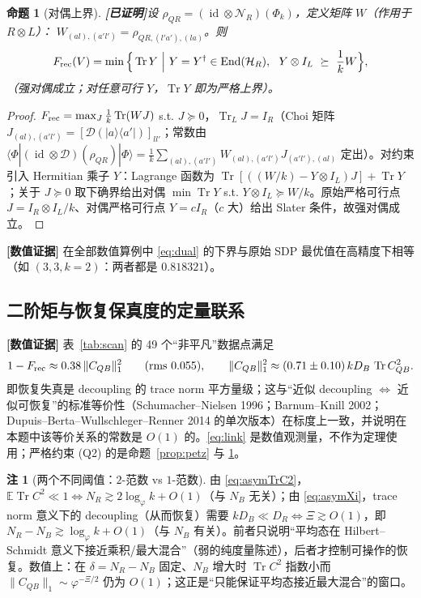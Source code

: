 \documentclass[11pt,a4paper]{ctexart}
\newtheorem{proposition}{命题}
\theoremstyle{definition}
\newtheorem{remark}{注}
\newcommand{\proved}{\textcolor{green!45!black}{\textbf{[已证明]}}}
\newcommand{\numeric}{\textcolor{blue!70!black}{\textbf{[数值证据]}}}
\newcommand{\Tr}{\operatorname{Tr}}
\newcommand{\End}{\operatorname{End}}
\newcommand{\id}{\operatorname{id}}
\newcommand{\E}{\mathbb{E}}
\newcommand{\ph}{\varphi}
\newcommand{\Frec}{F_{\rm rec}}
\begin{document}
\begin{proposition}[对偶上界]\proved{}\label{prop:dual}
设 $\rho_{QR}=(\id\otimes\mathcal N_R)(\Phi_k)$，定义矩阵 $W$（作用于 $R\otimes L$）：
$W_{(al),(a'l')}=\rho_{QR,(l'a'),(la)}$。则
\begin{equation}\label{eq:dual}
\Frec(V)=\min\Big\{\Tr Y\ \Big|\ Y=Y^\dagger\in\End(\mathcal H_R),\ \ Y\otimes I_L\ \succeq\ \frac{1}{k}W\Big\},
\end{equation}
（强对偶成立；对任意可行 $Y$，$\Tr Y$ 即为严格上界）。
\end{proposition}
\begin{proof}
$\Frec=\max_J\frac1k\Tr(WJ)$ s.t. $J\succeq0$，$\Tr_LJ=I_R$（Choi 矩阵 $J_{(al),(a'l')}=[\mathcal D(|a\rangle\langle a'|)]_{ll'}$；常数由
$\langle\Phi|(\id\otimes\mathcal D)(\rho_{QR})|\Phi\rangle=\frac1{k}\sum_{(al),(a'l')}W_{(al),(a'l')}J_{(a'l'),(al)}$ 定出）。对约束引入 Hermitian 乘子 $Y$：Lagrange 函数为 $\Tr[((W/k)-Y\otimes I_L)J]+\Tr Y$；关于 $J\succeq0$ 取下确界给出对偶 $\min\Tr Y$ s.t. $Y\otimes I_L\succeq W/k$。原始严格可行点 $J=I_R\otimes I_L/k$、对偶严格可行点 $Y=cI_R$（$c$ 大）给出 Slater 条件，故强对偶成立。
\end{proof}
\noindent\numeric{} 在全部数值算例中 \eqref{eq:dual} 的下界与原始 SDP 最优值在高精度下相等（如 $(3,3,k=2)$：两者都是 $0.818321$）。

\subsection{二阶矩与恢复保真度的定量联系}

\numeric{} 表~\ref{tab:scan} 的 49 个“非平凡”数据点满足
\begin{equation}\label{eq:link}
1-\Frec\approx 0.38\,\|C_{QB}\|_1^2\qquad(\text{rms }0.055),
\qquad
\|C_{QB}\|_1^2\approx(0.71\pm0.10)\,kD_B\,\Tr C_{QB}^2 .
\end{equation}
即恢复失真是 decoupling 的 trace norm 平方量级；这与“近似 decoupling $\Leftrightarrow$ 近似可恢复”的标准等价性（Schumacher--Nielsen 1996；Barnum--Knill 2002；Dupuis--Berta--Wullschleger--Renner 2014 的单次版本）在标度上一致，并说明在本题中该等价关系的常数是 $O(1)$ 的。\eqref{eq:link} 是数值观测量，不作为定理使用；严格约束 (Q2) 的是命题~\ref{prop:petz} 与 \ref{prop:dual}。

\begin{remark}[两个不同阈值：$2$-范数 vs $1$-范数]\label{rem:twothresholds}
由 \eqref{eq:asymTrC2}，$\E\Tr C^2\ll1\iff N_R\gtrsim 2\log_\ph k+O(1)$（与 $N_B$ 无关）；由 \eqref{eq:asymXi}，trace norm 意义下的 decoupling（从而恢复）需要
$kD_B\ll D_R\iff \Xi\gtrsim O(1)$，即 $N_R-N_B\gtrsim\log_\ph k+O(1)$（与 $N_B$ 有关）。前者只说明“平均态在 Hilbert--Schmidt 意义下接近乘积/最大混合”（弱的纯度量陈述），后者才控制可操作的恢复。数值上：在 $\delta=N_R-N_B$ 固定、$N_B$ 增大时 $\Tr C^2$ 指数小而 $\|C_{QB}\|_1\sim\ph^{-\Xi/2}$ 仍为 $O(1)$；这正是“只能保证平均态接近最大混合”的窗口。
\end{remark}
\end{document}
